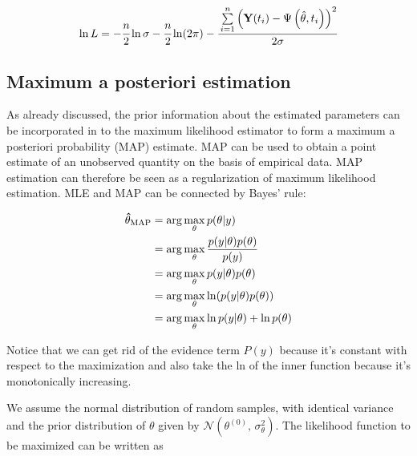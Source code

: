 \documentclass[a4paper,fleqn]{cas-dc}
\begin{document}
\begin{equation} 
	\ln L=-\cfrac{n}{2}\ln\sigma-\cfrac{n}{2}\ln(2\pi)-\cfrac{\sum\limits_{i=1}^n \left( \textbf{Y}(t_i) - \Psi\left( \hat{\theta}, t_i \right) \right)^2}{2\sigma}
\end{equation}

\subsection{Maximum a posteriori estimation}

As already discussed, the prior information about the estimated parameters can be incorporated in to the maximum likelihood estimator to form a maximum a posteriori probability (MAP) estimate. MAP can be used to obtain a point estimate of an unobserved quantity on the basis of empirical data. MAP estimation can therefore be seen as a regularization of maximum likelihood estimation. MLE and MAP can be connected by Bayes' rule:

\begin{equation} 
	\begin{split}
		{\bf \hat{\theta}_{\text{MAP}}} &= \arg\max_{\bf \theta} p(\theta | y) \\
		&= \arg\max_{\bf \theta} \frac{p(y | \theta) p(\theta)}{p(y)} \\
		&= \arg\max_{\bf \theta} p(y | \theta) p(\theta) \\
		&= \arg\max_{\bf \theta} \ln(p(y | \theta) p(\theta)) \\
		&= \arg\max_{\bf \theta} \ln p(y | \theta) + \ln p(\theta)
	\end{split}
\end{equation}

Notice that we can get rid of the evidence term $P(y)$ because it's constant with respect to the maximization and also take the ln of the inner function because it's monotonically increasing.

We assume the normal distribution of random samples, with identical variance and the prior distribution of $\theta$ given by $\mathcal{N}(\theta^{(0)},\,\sigma_\theta^{2})$. The likelihood function to be maximized can be written as
\end{document}
